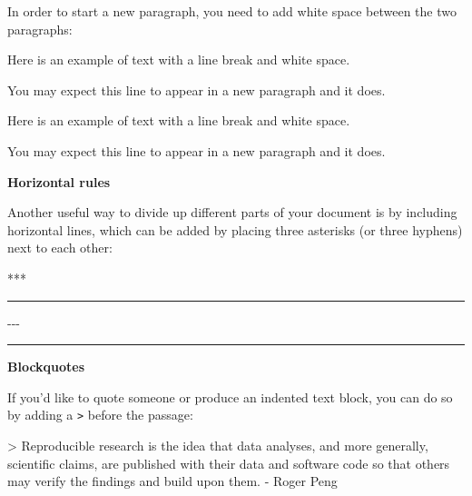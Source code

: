 \documentclass[]{tufte-book}
\newenvironment{Shaded}{\begin{snugshade}}{\end{snugshade}}
\newcommand{\DataTypeTok}[1]{\textcolor[rgb]{0.13,0.29,0.53}{#1}}
\newcommand{\NormalTok}[1]{#1}
\begin{document}
In order to start a new paragraph, you need to add white space between the two paragraphs:

\begin{Shaded}
\begin{Highlighting}[]
\NormalTok{Here is an example of text with a line break and white space.}

\NormalTok{You may expect this line to appear in a new paragraph and it does.}
\end{Highlighting}
\end{Shaded}

Here is an example of text with a line break and white space.

You may expect this line to appear in a new paragraph and it does.

\textbf{Horizontal rules}

Another useful way to divide up different parts of your document is by including horizontal lines, which can be added by placing three asterisks (or three hyphens) next to each other:

\begin{Shaded}
\begin{Highlighting}[]
\NormalTok{***}
\end{Highlighting}
\end{Shaded}

\begin{center}\rule{0.5\linewidth}{0.5pt}\end{center}

\begin{Shaded}
\begin{Highlighting}[]
\NormalTok{{-}{-}{-}}
\end{Highlighting}
\end{Shaded}

\begin{center}\rule{0.5\linewidth}{0.5pt}\end{center}

\textbf{Blockquotes}

If you'd like to quote someone or produce an indented text block, you can do so by adding a \texttt{\textgreater{}} before the passage:

\begin{Shaded}
\begin{Highlighting}[]
\NormalTok{>}\DataTypeTok{ Reproducible research is the idea that data analyses, and more generally,}
\DataTypeTok{scientific claims, are published with their data and software code so that}
\DataTypeTok{others may verify the findings and build upon them. {-} Roger Peng}
\end{Highlighting}
\end{Shaded}
\end{document}
